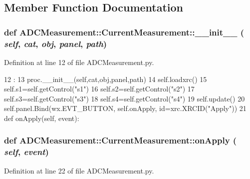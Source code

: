 \subsection{Member Function Documentation}
\hypertarget{classADCMeasurement_1_1CurrentMeasurement_ae173af588de91b26bebbef9b47a7db0c}{
\subsubsection[{\_\-\_\-init\_\-\_\-}]{\setlength{\rightskip}{0pt plus 5cm}def ADCMeasurement::CurrentMeasurement::\_\-\_\-init\_\-\_\- ( {\em self}, \/   {\em cat}, \/   {\em obj}, \/   {\em panel}, \/   {\em path})}}
\label{classADCMeasurement_1_1CurrentMeasurement_ae173af588de91b26bebbef9b47a7db0c}


Definition at line 12 of file ADCMeasurement.py.


\begin{DoxyCode}
12                                              :
13         proc.__init__(self,cat,obj,panel,path)
14         self.loadxrc()
15         self.s1=self.getControl("s1")
16         self.s2=self.getControl("s2")
17         self.s3=self.getControl("s3")
18         self.s4=self.getControl("s4")
19         self.update()
20         self.panel.Bind(wx.EVT_BUTTON, self.onApply, id=xrc.XRCID("Apply"))
21 
    def onApply(self, event):
\end{DoxyCode}
\hypertarget{classADCMeasurement_1_1CurrentMeasurement_a7ccea573b2529acbb2899bcc979eed58}{
\subsubsection[{onApply}]{\setlength{\rightskip}{0pt plus 5cm}def ADCMeasurement::CurrentMeasurement::onApply ( {\em self}, \/   {\em event})}}
\label{classADCMeasurement_1_1CurrentMeasurement_a7ccea573b2529acbb2899bcc979eed58}


Definition at line 22 of file ADCMeasurement.py.


